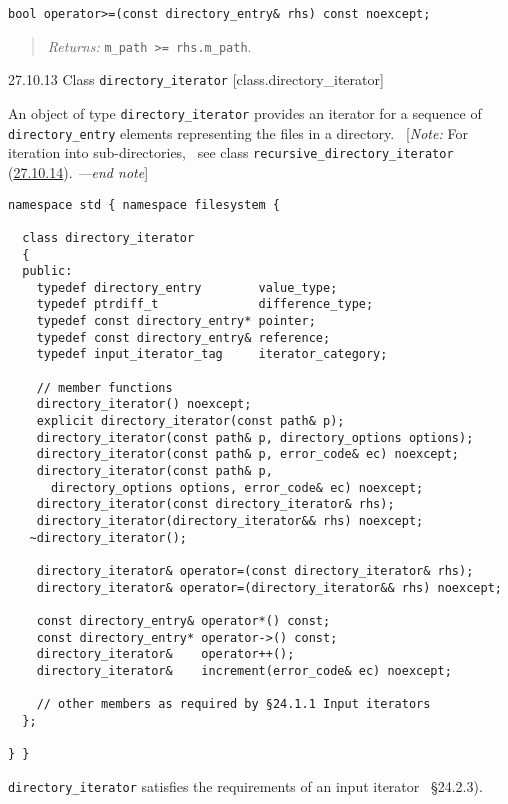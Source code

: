 \begin{verbatim}
bool operator>=(const directory_entry& rhs) const noexcept;
\end{verbatim}

\begin{quote}
\emph{Returns:} \texttt{m\_path\ \textgreater{}=\ rhs.m\_path}.
\end{quote}

27.10.13 Class \texttt{directory\_iterator}
{[}class.directory\_iterator{]}

An object of type \texttt{directory\_iterator} provides an iterator for
a sequence of \texttt{directory\_entry} elements representing the files
in a directory.~ {[}\emph{Note:} For iteration into sub-directories,~
see class \texttt{recursive\_directory\_iterator}
(\hyperref[class.rec.dir.itr]{27.10.14}). \emph{---end note}{]}

\begin{verbatim}
namespace std { namespace filesystem {

  class directory_iterator
  {
  public:
    typedef directory_entry        value_type;
    typedef ptrdiff_t              difference_type;
    typedef const directory_entry* pointer;
    typedef const directory_entry& reference;
    typedef input_iterator_tag     iterator_category;

    // member functions
    directory_iterator() noexcept;
    explicit directory_iterator(const path& p);
    directory_iterator(const path& p, directory_options options);
    directory_iterator(const path& p, error_code& ec) noexcept;
    directory_iterator(const path& p,
      directory_options options, error_code& ec) noexcept;
    directory_iterator(const directory_iterator& rhs);
    directory_iterator(directory_iterator&& rhs) noexcept;
   ~directory_iterator();

    directory_iterator& operator=(const directory_iterator& rhs);
    directory_iterator& operator=(directory_iterator&& rhs) noexcept;
    
    const directory_entry& operator*() const;
    const directory_entry* operator->() const;
    directory_iterator&    operator++();
    directory_iterator&    increment(error_code& ec) noexcept;

    // other members as required by §24.1.1 Input iterators 
  };

} }
\end{verbatim}

\texttt{directory\_iterator} satisfies the requirements of an input
iterator~ §24.2.3).

